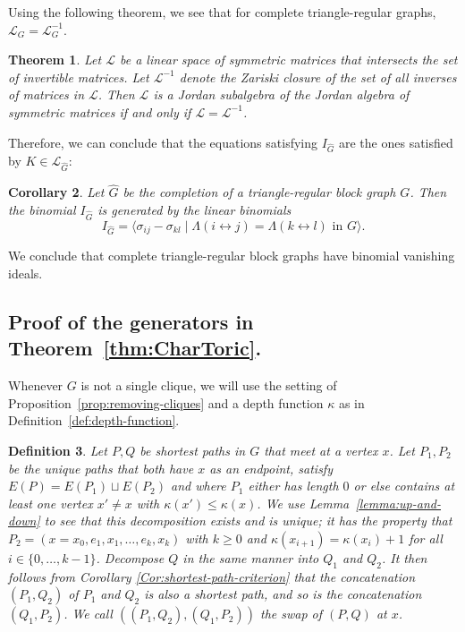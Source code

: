\documentclass[a4paper, 11pt]{amsart}
\newtheorem{theorem}{Theorem}
\numberwithin{theorem}{section}
\newtheorem{definition}[theorem]{Definition}
\newtheorem{corollary}[theorem]{Corollary}
\begin{document}
Using the following theorem, we see that for complete triangle-regular graphs, $\mathcal{L}_G = \mathcal{L}^{-1}_G$.

\begin{theorem}{\cite[Lemma~1]{Jensen88}}
    Let $\mathcal{L}$ be a linear space of symmetric matrices that
    intersects the set of invertible matrices. Let $\mathcal{L}^{-1}$
    denote the Zariski closure of the set of all inverses of matrices
    in $\mathcal{L}$. Then $\mathcal{L}$ is a Jordan subalgebra of the
    Jordan algebra of symmetric matrices if and only if $\mathcal{L} = \mathcal{L}^{-1}$.
\end{theorem}
Therefore, we can conclude that the equations satisfying $I_{\hat{G}}$ are the ones satisfied by $K \in \mathcal{L}_{\hat{G}}$:
\begin{corollary} \label{cor:completion-eqs}
    Let $\hat{G}$ be the completion of a triangle-regular block graph
    $G$. Then the binomial $I_{\hat{G}}$ is generated by the linear
    binomials
    \[
    I_{\hat{G}} =\langle \sigma _{ij} - \sigma _{kl} \mid \Lambda (i \leftrightarrow j) = \Lambda (k \leftrightarrow l) \text{ in } G \rangle.
    \]
\end{corollary}
We conclude that complete triangle-regular block graphs have binomial vanishing ideals. 

\subsection{Proof of the generators in Theorem~\ref{thm:CharToric}.}

Whenever $G$ is not a single clique, we will use the setting of
Proposition~\ref{prop:removing-cliques} and a depth function $\kappa$ as in
Definition~\ref{def:depth-function}.

\begin{definition}
Let $P,Q$ be shortest paths in $G$ that meet at a vertex $x$. Let
$P_1,P_2$ be the unique paths that both have $x$ as an endpoint,
satisfy $E(P)=E(P_1) \sqcup E(P_2)$ and where $P_1$ either has
length $0$ or else contains at least one vertex $x' \neq x$ with
$\kappa(x') \leq \kappa(x)$. We use Lemma~\ref{lemma:up-and-down}
to see that this decomposition exists and is unique; it has the
property that $P_2=(x=x_0,e_1,x_1,\ldots,e_k,x_k)$ with $k \geq 0$ and
$\kappa(x_{i+1})=\kappa(x_i)+1$ for all $i \in \{0,\ldots,k-1\}$. Decompose $Q$ in the same
manner into $Q_1$ and $Q_2$. It then follows from Corollary \ref{Cor:shortest-path-criterion} that the concatenation
$(P_1,Q_2)$ of $P_1$ and $Q_2$ is also a shortest path, and so is the
concatenation $(Q_1,P_2)$. We call $((P_1,Q_2),(Q_1,P_2))$ the {\em swap}
of $(P,Q)$ at $x$.
\end{definition}
\end{document}
